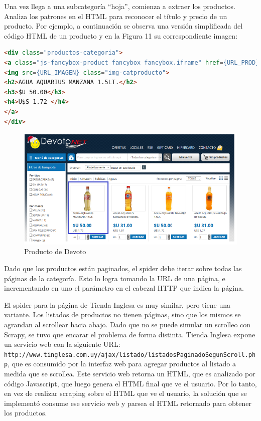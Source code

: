 \documentclass[12pt]{article} %
\begin{document}
Una vez llega a una subcategoría “hoja”, comienza a extraer los productos. Analiza los patrones en el HTML para reconocer el título y precio de un producto. Por ejemplo, a continuación se observa una versión simplificada del código HTML de un producto y en la Figura 11 su correspondiente imagen:


\begin{lstlisting}[language=HTML]
<div class="productos-categoria">
<a class="js-fancybox-product fancybox fancybox.iframe" href={URL_PROD}>
<img src={URL_IMAGEN} class="img-catproducto">
<h2>AGUA AQUARIUS MANZANA 1.5LT.</h2>
<h3>$U 50.00</h3>
<h4>U$S 1.72 </h4>
</a>
</div>
\end{lstlisting}

\begin{figure}[H]
\includegraphics[height=0.30\textwidth]{producto_devoto}
\centering
\caption{Producto de Devoto}
\end{figure}


Dado que los productos están paginados, el spider debe iterar sobre todas las páginas de la categoría. Esto lo logra tomando la URL de una página, e incrementando en uno el parámetro en el cabezal HTTP que indica la página.

El spider para la página de Tienda Inglesa \cite{TInglesa} es muy similar, pero tiene una variante. Los listados de productos no tienen páginas, sino que los mismos se agrandan al scrollear hacia abajo. Dado que no se puede simular un scrolleo con Scrapy, se tuvo que encarar el problema de forma distinta. Tienda Inglesa expone un servicio web con la siguiente URL: \texttt{http://www.tinglesa.com.uy/ajax/listado/listadosPaginadoSegunScroll.php}, que es consumido por la interfaz web para agregar productos al listado a medida que se scrollea. Este servicio web retorna un HTML, que es analizado por código Javascript, que luego genera el HTML final que ve el usuario. Por lo tanto, en vez de realizar scraping sobre el HTML que ve el usuario, la solución que se implementó consume ese servicio web y parsea el HTML retornado para obtener los productos.

\end{document}
